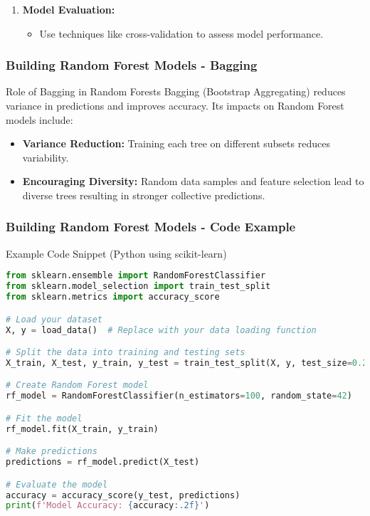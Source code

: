 \documentclass[aspectratio=169]{beamer}
\begin{document}
\begin{frame}[fragile]
\begin{enumerate}
        \item \textbf{Model Evaluation:}
            \begin{itemize}
                \item Use techniques like cross-validation to assess model performance.
            \end{itemize}
    \end{enumerate}
\end{frame}

\begin{frame}[fragile]
    \frametitle{Building Random Forest Models - Bagging}
    \begin{block}{Role of Bagging in Random Forests}
        Bagging (Bootstrap Aggregating) reduces variance in predictions and improves accuracy. Its impacts on Random Forest models include:
        \begin{itemize}
            \item \textbf{Variance Reduction:} Training each tree on different subsets reduces variability.
            \item \textbf{Encouraging Diversity:} Random data samples and feature selection lead to diverse trees resulting in stronger collective predictions.
        \end{itemize}
    \end{block}
\end{frame}

\begin{frame}[fragile]
    \frametitle{Building Random Forest Models - Code Example}
    \begin{block}{Example Code Snippet (Python using scikit-learn)}
        \begin{lstlisting}[language=Python]
from sklearn.ensemble import RandomForestClassifier
from sklearn.model_selection import train_test_split
from sklearn.metrics import accuracy_score

# Load your dataset
X, y = load_data()  # Replace with your data loading function

# Split the data into training and testing sets
X_train, X_test, y_train, y_test = train_test_split(X, y, test_size=0.2)

# Create Random Forest model
rf_model = RandomForestClassifier(n_estimators=100, random_state=42)

# Fit the model
rf_model.fit(X_train, y_train)

# Make predictions
predictions = rf_model.predict(X_test)

# Evaluate the model
accuracy = accuracy_score(y_test, predictions)
print(f'Model Accuracy: {accuracy:.2f}')
        \end{lstlisting}
    \end{block}
\end{frame}
\end{document}
